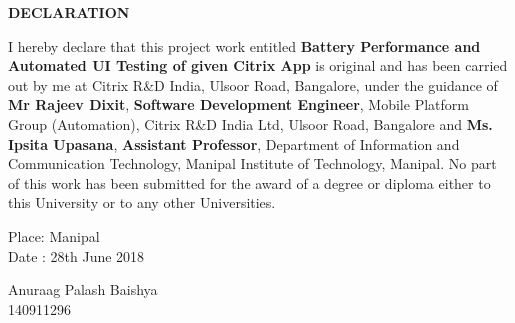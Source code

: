 \begin{center}
\large{\textbf{DECLARATION}}\\
\vspace{1cm}
\end{center}

\justify I hereby declare that this project work entitled \textbf{Battery Performance and Automated UI Testing of given Citrix App} is original and has been carried out by
me at Citrix R\&D India, Ulsoor Road, Bangalore, under the guidance of \textbf{Mr Rajeev Dixit}, \textbf{Software Development Engineer}, Mobile Platform Group (Automation), Citrix R\&D India Ltd, Ulsoor Road, Bangalore and \textbf{Ms. Ipsita Upasana}, \textbf{Assistant Professor},  Department of Information and Communication Technology, Manipal Institute of Technology, Manipal. No part of this work has been submitted for the award of a degree or diploma either to this University or to any other Universities.



\vspace{2cm}

\begin{flushleft}
Place: Manipal\\
Date : 28th June 2018
\end{flushleft}


\begin{flushright}
Anuraag Palash Baishya\\
140911296
\end{flushright}